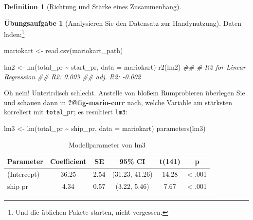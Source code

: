 \documentclass[
  a4paper,
  DIV=11]{scrreprt}
\newenvironment{Shaded}{\begin{snugshade}}{\end{snugshade}}
\newcommand{\AttributeTok}[1]{\textcolor[rgb]{0.40,0.45,0.13}{#1}}
\newcommand{\DocumentationTok}[1]{\textcolor[rgb]{0.37,0.37,0.37}{\textit{#1}}}
\newcommand{\FunctionTok}[1]{\textcolor[rgb]{0.28,0.35,0.67}{#1}}
\newcommand{\NormalTok}[1]{\textcolor[rgb]{0.00,0.23,0.31}{#1}}
\newcommand{\OtherTok}[1]{\textcolor[rgb]{0.00,0.23,0.31}{#1}}
\newcommand{\SpecialCharTok}[1]{\textcolor[rgb]{0.37,0.37,0.37}{#1}}
\theoremstyle{definition}
\newtheorem{exercise}{Übungsaufgabe}[chapter]
\theoremstyle{definition}
\theoremstyle{definition}
\newtheorem{definition}{Definition}[chapter]
\theoremstyle{remark}
\begin{document}
\begin{definition}[Richtung und Stärke eines
Zusammenhang]
\begin{exercise}[Analysieren Sie den Datensatz zur
Handynutzung]
Daten laden:\footnote{Und die üblichen Pakete starten, nicht vergessen.}

\begin{Shaded}
\begin{Highlighting}[]
\NormalTok{mariokart }\OtherTok{\textless{}{-}} \FunctionTok{read.csv}\NormalTok{(mariokart\_path)}
\end{Highlighting}
\end{Shaded}

\begin{Shaded}
\begin{Highlighting}[]
\NormalTok{lm2 }\OtherTok{\textless{}{-}} \FunctionTok{lm}\NormalTok{(total\_pr }\SpecialCharTok{\textasciitilde{}}\NormalTok{ start\_pr, }\AttributeTok{data =}\NormalTok{ mariokart)}
\FunctionTok{r2}\NormalTok{(lm2)}
\DocumentationTok{\#\# \# R2 for Linear Regression}
\DocumentationTok{\#\#        R2: 0.005}
\DocumentationTok{\#\#   adj. R2: {-}0.002}
\end{Highlighting}
\end{Shaded}

Oh nein! Unterirdisch schlecht. Anstelle von bloßem Rumprobieren
überlegen Sie und schauen dann in \textbf{?@fig-mario-corr} nach, welche
Variable am stärksten korreliert mit \texttt{total\_pr}; es resultiert
\texttt{lm3}:

\begin{Shaded}
\begin{Highlighting}[]
\NormalTok{lm3 }\OtherTok{\textless{}{-}} \FunctionTok{lm}\NormalTok{(total\_pr }\SpecialCharTok{\textasciitilde{}}\NormalTok{ ship\_pr, }\AttributeTok{data =}\NormalTok{ mariokart)}
\FunctionTok{parameters}\NormalTok{(lm3)}
\end{Highlighting}
\end{Shaded}

\begin{longtable}[]{@{}lccccc@{}}

\caption{\label{tbl-lm3}Modellparameter von lm3}

\tabularnewline

\toprule\noalign{}
Parameter & Coefficient & SE & 95\% CI & t(141) & p \\
\midrule\noalign{}
\endhead
\bottomrule\noalign{}
\endlastfoot
(Intercept) & 36.25 & 2.54 & (31.23, 41.26) & 14.28 & \textless{}
.001 \\
ship pr & 4.34 & 0.57 & (3.22, 5.46) & 7.67 & \textless{} .001 \\

\end{longtable}


\end{exercise}
\end{definition}
\end{document}
